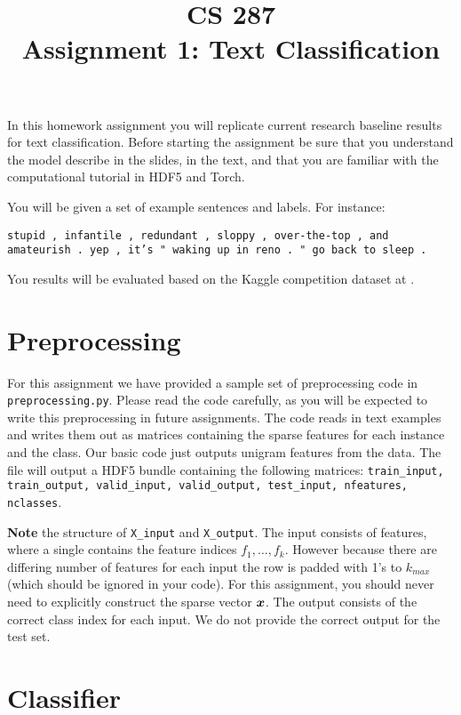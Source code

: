 \documentclass[11pt]{article}
\title{CS 287 \\ Assignment 1: Text Classification }
\date{}
\begin{document}
\maketitle{}

In this homework assignment you will replicate current
research baseline results for text classification. Before 
starting the assignment be sure that you understand the model 
describe in the slides, in the text, and that you are familiar 
with the computational tutorial in HDF5 and Torch. 


You will be given a set of example sentences and labels. For instance: 


\vspace{0.5cm}

\noindent
\texttt{stupid , infantile , redundant , sloppy , over-the-top , and amateurish . yep , it's " waking up in reno . " go back to sleep . }

You results will be evaluated based on the Kaggle competition dataset at \url{}.

\section{Preprocessing}

For this assignment we have provided a sample set of preprocessing
code in \texttt{preprocessing.py}. Please read the code carefully, as
you will be expected to write this preprocessing in future
assignments.  The code reads in text examples and writes them out as
matrices containing the sparse features for each instance and the
class. Our basic code just outputs unigram features from the data.
The file will output a HDF5 bundle containing the following matrices:
\texttt{train\_input, train\_output, valid\_input, valid\_output, test\_input, nfeatures, nclasses}.

\textbf{Note} the structure of \texttt{X\_input} and
\texttt{X\_output}. The input consists of features, where a single
contains the feature indices $f_1, \ldots, f_k$. However because there
are differing number of features for each input the row is padded with
1's to $k_{max}$ (which should be ignored in your code).  For this
assignment, you should never need to explicitly construct the sparse
vector $\boldsymbol{x}$. The output consists of the correct class index for
each input. We do not provide the correct output for the test set.

\section{Classifier}
\end{document}
